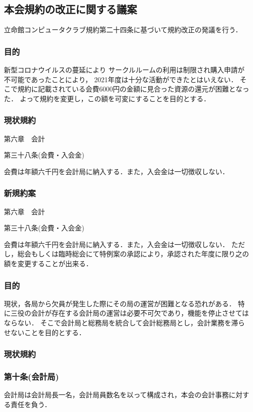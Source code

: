 \subsection*{本会規約の改正に関する議案}

立命館コンピュータクラブ規約第二十四条に基づいて規約改正の発議を行う．

\subsubsection*{目的}
新型コロナウイルスの蔓延により
サークルルームの利用は制限され購入申請が不可能であったことにより，
2021年度は十分な活動ができたとはいえない．
そこで規約に記載されている会費6000円の金額に見合った資源の還元が困難となった．
よって規約を変更し，この額を可変にすることを目的とする．

\subsubsection*{現状規約}
第六章　会計

第三十八条(会費・入会金)

会費は年額六千円を会計局に納入する．また，入会金は一切徴収しない．

\subsubsection*{新規約案}
第六章　会計

第三十八条(会費・入会金)

会費は年額六千円を会計局に納入する．また，入会金は一切徴収しない．
ただし，総会もしくは臨時総会にて特例案の承認により，承認された年度に限り之の額を変更することが出来る．

\subsubsection*{目的}
現状，各局から欠員が発生した際にその局の運営が困難となる恐れがある．
特に三役の会計が存在する会計局の運営は必要不可欠であり，機能を停止させてはならない．
そこで会計局と総務局を統合して会計総務局とし，会計業務を滞らせないことを目的とする．

\subsubsection*{現状規約}
\subsubsection*{第十条(会計局)}
会計局は会計局長一名，会計局員数名を以って構成され，本会の会計事務に対する責任を負う．

